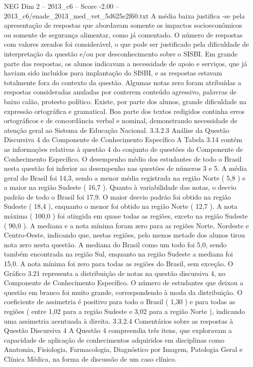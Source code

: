 \begin{textsample}{NEG Dim 2 – 2013\_c6 – Score -2.00 – 2013\_c6/enade\_2013\_med\_vet\_5d625e2f60.txt}
A média baixa justifica -se pela apresentação de respostas que abordavam somente os impactos socioeconômicos ou somente de segurança alimentar, como já comentado.
O número de respostas com valores zerados foi considerável, o que pode ser justificado pela dificuldade de interpretação da questão e/ou por desconhecimento sobre o SISBI.
Em grande parte das respostas, os alunos indicavam a necessidade de apoio e serviços, que já haviam sido incluídos para implantação do SISBI, e as respostas estavam totalmente fora do contexto da questão.
Algumas notas zero foram atribuídas a respostas consideradas anuladas por conterem conteúdo agressivo, palavras de baixo calão, protesto político.
Existe, por parte dos alunos, grande dificuldade na expressão ortográfica e gramatical.
Boa parte dos textos redigidos continha erros ortográficos e de concordância verbal e nominal, demonstrando necessidade de atenção geral ao Sistema de Educação Nacional. 3.3.2.3 Análise da Questão Discursiva 4 do Componente de Conhecimento Específico A Tabela 3.14 contém as informações relativas à questão 4 do conjunto de questões do Componente de Conhecimento Específico.
O desempenho médio dos estudantes de todo o Brasil nesta questão foi inferior ao desempenho nas questões de números 3 e 5.
A média geral do Brasil foi 14,3, sendo a menor média registrada na região Norte ( 5,8 ) e a maior na região Sudeste ( 16,7 ).
Quanto à variabilidade das notas, o desvio padrão de todo o Brasil foi 17,9.
O maior desvio padrão foi obtido na região Sudeste ( 18,4 ), enquanto o menor foi obtido na região Norte ( 12,7 ).
A nota máxima ( 100,0 ) foi atingida em quase todas as regiões, exceto na região Sudeste ( 90,0 ).
A mediana e a nota mínima foram zero para as regiões Norte, Nordeste e Centro-Oeste, indicando que, nestas regiões, pelo menos metade dos alunos tirou nota zero nesta questão.
A mediana do Brasil como um todo foi 5,0, sendo também encontrada na região Sul, enquanto na região Sudeste a mediana foi 15,0.
A nota mínima foi zero para todas as regiões do Brasil, sem exceção.
O Gráfico 3.21 representa a distribuição de notas na questão discursiva 4, no Componente de Conhecimento Específico.
O número de estudantes que deixou a questão em branco foi muito grande, correspondendo à moda da distribuição.
O coeficiente de assimetria é positivo para todo o Brasil ( 1,30 ) e para todas as regiões ( entre 1,02 para a região Sudeste e 3,02 para a região Norte ), indicando uma assimetria acentuada à direita. 3.3.2.4 Comentários sobre as respostas à Questão Discursiva 4 A Questão 4 compreendia três itens, que exploravam a capacidade de aplicação de conhecimentos adquiridos em disciplinas como Anatomia, Fisiologia, Farmacologia, Diagnóstico por Imagem, Patologia Geral e Clínica Médica, na forma de discussão de um caso clínico.

\end{textsample}
